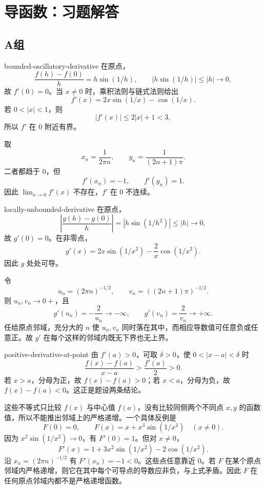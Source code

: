 \chapter{导函数：习题解答}

\section*{A组}

\begin{solution}{bounded-oscillatory-derivative}
在原点，
\[
 \frac{f(h)-f(0)}h=h\sin(1/h),
 \qquad
 \left|h\sin(1/h)\right|\le |h|\longrightarrow0,
\]
故 \(f'(0)=0\)。当 \(x\ne0\) 时，乘积法则与链式法则给出
\[
 f'(x)=2x\sin(1/x)-\cos(1/x).
\]
若 \(0<|x|<1\)，则
\[
 |f'(x)|\le2|x|+1<3,
\]
所以 \(f'\) 在 \(0\) 附近有界。

取
\[
 x_n=\frac1{2\pi n},
 \qquad
 y_n=\frac1{(2n+1)\pi}.
\]
二者都趋于 \(0\)，但
\[
 f'(x_n)=-1,
 \qquad
 f'(y_n)=1.
\]
因此 \(\lim_{x\to0}f'(x)\) 不存在，\(f'\) 在 \(0\) 不连续。
\end{solution}

\begin{solution}{locally-unbounded-derivative}
在原点，
\[
 \left|\frac{g(h)-g(0)}h\right|
 =|h\sin(1/h^2)|\le |h|\longrightarrow0,
\]
故 \(g'(0)=0\)。在非零点，
\[
 g'(x)=2x\sin(1/x^2)-\frac2x\cos(1/x^2).
\]
因此 \(g\) 处处可导。

令
\[
 u_n=(2\pi n)^{-1/2},
 \qquad
 v_n=((2n+1)\pi)^{-1/2}.
\]
则 \(u_n,v_n\to0+\)，且
\[
 g'(u_n)=-\frac2{u_n}\to-\infty,
 \qquad
 g'(v_n)=\frac2{v_n}\to+\infty.
\]
任给原点邻域，充分大的 \(n\) 使 \(u_n,v_n\) 同时落在其中，而相应导数值可任意负或任意正。故 \(g'\) 在每个这样的邻域内既无下界也无上界。
\end{solution}

\begin{solution}{positive-derivative-at-point}
由 \(f'(a)>0\)，可取 \(\delta>0\)，使 \(0<|x-a|<\delta\) 时
\[
 \frac{f(x)-f(a)}{x-a}>\frac{f'(a)}2>0.
\]
若 \(x>a\)，分母为正，故 \(f(x)-f(a)>0\)；若 \(x<a\)，分母为负，故 \(f(x)-f(a)<0\)。这正是题设两条结论。

这些不等式只比较 \(f(x)\) 与中心值 \(f(a)\)，没有比较同侧两个不同点 \(x,y\) 的函数值，所以不能推出邻域上的严格递增。一个具体反例是
\[
 F(0)=0,
 \qquad
 F(x)=x+x^3\sin(1/x^2)\quad(x\ne0).
\]
因为 \(x^2\sin(1/x^2)\to0\)，有 \(F'(0)=1\)。但对 \(x\ne0\)，
\[
 F'(x)=1+3x^2\sin(1/x^2)-2\cos(1/x^2).
\]
沿 \(x_n=(2\pi n)^{-1/2}\) 有 \(F'(x_n)=-1<0\)。这些点任意靠近 \(0\)。若 \(F\) 在某个原点邻域内严格递增，则它在其中每个可导点的导数应非负，与上式矛盾。因此 \(F\) 在任何原点邻域内都不是严格递增函数。
\end{solution}

